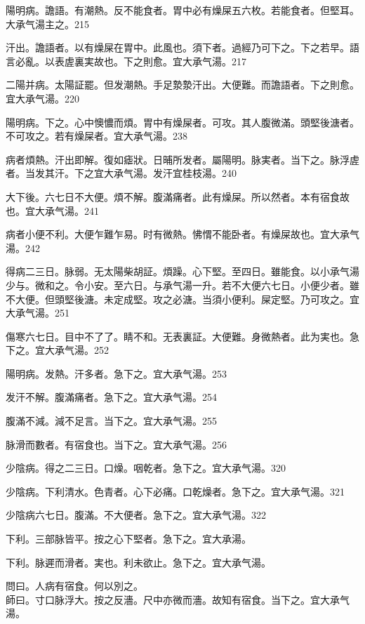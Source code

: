 陽明病。譫語。有潮熱。反不能食者。{\khaai 胃中}必有燥屎五六枚。若能食者。但堅耳。{\khaai 大}承气湯主之。215

汗出。譫語者。以有燥屎在胃中。此風也。{\khaai 須下者。}過經乃可下之。下之若早。語言必亂。以表虗裏実故也。下之則愈。宜{\khaai 大}承气湯。217

二陽并病。太陽証罷。但发潮熱。手足漐漐汗出。大便難。而譫語者。下之則愈。宜{\khaai 大}承气湯。220

陽明病。下之。心中懊憹而煩。胃中有燥屎者。可攻。其人腹微滿。頭堅後溏者。不可攻之。若有燥屎者。宜{\khaai 大}承气湯。238

病者煩熱。汗出即解。復如瘧狀。日晡所发者。屬陽明。脉実者。当下之。脉浮虗者。当发其汗。下之宜{\khaai 大}承气湯。发汗宜桂枝湯。240

大下後。六七日不大便。煩不解。腹滿痛者。此有燥屎。所以然者。本有宿食故也。宜{\khaai 大}承气湯。241

病者小便不利。大便乍難乍易。时有微熱。怫㥜不能卧者。有燥屎故也。宜{\khaai 大}承气湯。242

得病二三日。脉弱。无太陽柴胡証。煩躁。心下堅。至四日。雖能食。以{\khaai 小}承气湯少与。微和之。令小安。至六日。与承气湯一升。若不大便六七日。小便少者。雖不大便。但頭堅後溏。未定成堅。攻之必溏。当須小便利。屎定堅。乃可攻之。宜{\khaai 大}承气湯。251

傷寒六七日。目中不了了。睛不和。无表{\khaai 裏}証。大便難。身微熱者。此为実也。急下之。宜{\khaai 大}承气湯。252

陽明病。发熱。汗多者。急下之。宜{\khaai 大}承气湯。253

发汗不解。腹滿痛者。急下之。宜{\khaai 大}承气湯。254

腹滿不減。減不足言。当下之。宜{\khaai 大}承气湯。255

脉滑而數者。有宿食也。当下之。宜{\khaai 大}承气湯。256

少陰病。得之二三日。口燥。咽乾者。急下之。宜{\khaai 大}承气湯。320

少陰病。{\khaai 下}利清水。色青者。心下必痛。口乾燥者。急下之。宜{\khaai 大}承气湯。321

少陰病六七日。腹滿。不大便者。急下之。宜{\khaai 大}承气湯。322

下利。三部脉皆平。按之心下堅者。急下之。宜大承湯。

下利。脉遲而滑者。実也。利未欲止。急下之。宜大承气湯。

問曰。人病有宿食。何以別之。\\
師曰。寸口脉浮大。按之反濇。尺中亦微而濇。故知有宿食。当下之。宜{\khaai 大}承气湯。

